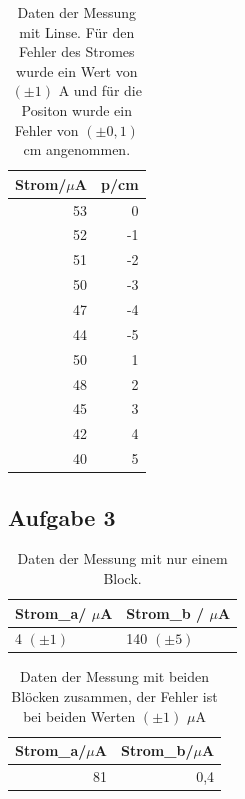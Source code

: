 \documentclass[12pt]{scrartcl}
\begin{document}
\begin{table}[H]
\caption{Daten der Messung mit Linse. Für den Fehler des Stromes wurde ein Wert von $(\pm 1)$ A und für die Positon wurde ein Fehler von $(\pm 0,1)$ cm angenommen.}
\centering
\begin{tabular}{|r|r|}
\hline
\multicolumn{1}{|l|}{Strom/$\mu$A} & \multicolumn{1}{l|}{p/cm} \\ \hline
53 & 0 \\ \hline
52 & -1 \\ \hline
51 & -2 \\ \hline
50 & -3 \\ \hline
47 & -4 \\ \hline
44 & -5 \\ \hline
50 & 1 \\ \hline
48 & 2 \\ \hline
45 & 3 \\ \hline
42 & 4 \\ \hline
40 & 5 \\ \hline
\end{tabular}
\label{tab:a_2_m}
\end{table}

\subsection{Aufgabe 3}

\begin{table}[htbp]
\caption{Daten der Messung mit nur einem Block.}
\centering
\begin{tabular}{|l|l|}
\hline
Strom\_a/ $\mu$A & Strom\_b / $\mu$A \\ \hline
4 $(\pm1)$ & 140 $(\pm 5)$ \\ \hline
\end{tabular}
\label{tab:a_3_e}
\end{table}

\begin{table}[H]
\caption{Daten der Messung mit beiden Blöcken zusammen, der Fehler ist bei beiden Werten $(\pm 1)$ $\mu$A}
\centering
\begin{tabular}{|l|l|}
\hline
Strom\_a/$\mu$A & Strom\_b/$\mu$A \\ \hline
\multicolumn{1}{|r|}{81} & \multicolumn{1}{r|}{0,4} \\ \hline
\end{tabular}
\label{tab:a_3_z}
\end{table}
\end{document}
